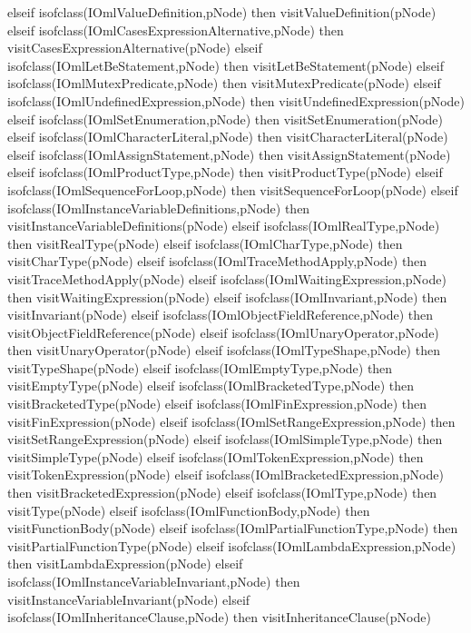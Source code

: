 \begin{vdm_al}
      elseif isofclass(IOmlValueDefinition,pNode) then visitValueDefinition(pNode)
      elseif isofclass(IOmlCasesExpressionAlternative,pNode) then visitCasesExpressionAlternative(pNode)
      elseif isofclass(IOmlLetBeStatement,pNode) then visitLetBeStatement(pNode)
      elseif isofclass(IOmlMutexPredicate,pNode) then visitMutexPredicate(pNode)
      elseif isofclass(IOmlUndefinedExpression,pNode) then visitUndefinedExpression(pNode)
      elseif isofclass(IOmlSetEnumeration,pNode) then visitSetEnumeration(pNode)
      elseif isofclass(IOmlCharacterLiteral,pNode) then visitCharacterLiteral(pNode)
      elseif isofclass(IOmlAssignStatement,pNode) then visitAssignStatement(pNode)
      elseif isofclass(IOmlProductType,pNode) then visitProductType(pNode)
      elseif isofclass(IOmlSequenceForLoop,pNode) then visitSequenceForLoop(pNode)
      elseif isofclass(IOmlInstanceVariableDefinitions,pNode) then visitInstanceVariableDefinitions(pNode)
      elseif isofclass(IOmlRealType,pNode) then visitRealType(pNode)
      elseif isofclass(IOmlCharType,pNode) then visitCharType(pNode)
      elseif isofclass(IOmlTraceMethodApply,pNode) then visitTraceMethodApply(pNode)
      elseif isofclass(IOmlWaitingExpression,pNode) then visitWaitingExpression(pNode)
      elseif isofclass(IOmlInvariant,pNode) then visitInvariant(pNode)
      elseif isofclass(IOmlObjectFieldReference,pNode) then visitObjectFieldReference(pNode)
      elseif isofclass(IOmlUnaryOperator,pNode) then visitUnaryOperator(pNode)
      elseif isofclass(IOmlTypeShape,pNode) then visitTypeShape(pNode)
      elseif isofclass(IOmlEmptyType,pNode) then visitEmptyType(pNode)
      elseif isofclass(IOmlBracketedType,pNode) then visitBracketedType(pNode)
      elseif isofclass(IOmlFinExpression,pNode) then visitFinExpression(pNode)
      elseif isofclass(IOmlSetRangeExpression,pNode) then visitSetRangeExpression(pNode)
      elseif isofclass(IOmlSimpleType,pNode) then visitSimpleType(pNode)
      elseif isofclass(IOmlTokenExpression,pNode) then visitTokenExpression(pNode)
      elseif isofclass(IOmlBracketedExpression,pNode) then visitBracketedExpression(pNode)
      elseif isofclass(IOmlType,pNode) then visitType(pNode)
      elseif isofclass(IOmlFunctionBody,pNode) then visitFunctionBody(pNode)
      elseif isofclass(IOmlPartialFunctionType,pNode) then visitPartialFunctionType(pNode)
      elseif isofclass(IOmlLambdaExpression,pNode) then visitLambdaExpression(pNode)
      elseif isofclass(IOmlInstanceVariableInvariant,pNode) then visitInstanceVariableInvariant(pNode)
      elseif isofclass(IOmlInheritanceClause,pNode) then visitInheritanceClause(pNode)

\end{vdm_al}
